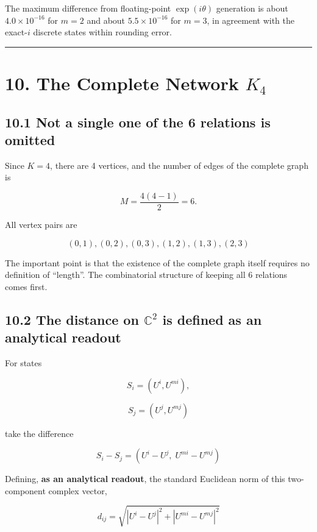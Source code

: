 \documentclass[
  a4paper,
]{article}
\begin{document}
The maximum difference from floating-point \(\exp(i\theta)\) generation
is about \(4.0\times10^{-16}\) for \(m=2\) and about
\(5.5\times10^{-16}\) for \(m=3\), in agreement with the exact-\(i\)
discrete states within rounding error.

\begin{center}\rule{0.5\linewidth}{0.5pt}\end{center}

\section{\texorpdfstring{10. The Complete Network
\(K_4\)}{10. The Complete Network K\_4}}\label{the-complete-network-k_4}

\subsection{10.1 Not a single one of the 6 relations is
omitted}\label{not-a-single-one-of-the-6-relations-is-omitted}

Since \(K=4\), there are 4 vertices, and the number of edges of the
complete graph is

\[
M
=
\frac{4(4-1)}{2}
=
6.
\]

All vertex pairs are

\[
(0,1),
(0,2),
(0,3),
(1,2),
(1,3),
(2,3)
\]

The important point is that the existence of the complete graph itself
requires no definition of ``length''. The combinatorial structure of
keeping all 6 relations comes first.

\subsection{\texorpdfstring{10.2 The distance on \(\mathbb C^2\) is
defined as an analytical
readout}{10.2 The distance on \textbackslash mathbb C\^{}2 is defined as an analytical readout}}\label{the-distance-on-mathbb-c2-is-defined-as-an-analytical-readout}

For states

\[
S_i=(U^i,U^{mi}),
\]

\[
S_j=(U^j,U^{mj})
\]

take the difference

\[
S_i-S_j
=
(U^i-U^j,\;U^{mi}-U^{mj})
\]

Defining, \textbf{as an analytical readout}, the standard Euclidean norm
of this two-component complex vector,

\[
\boxed{
d_{ij}
=
\sqrt{
|U^i-U^j|^2
+
|U^{mi}-U^{mj}|^2
}
}
\]
\end{document}
